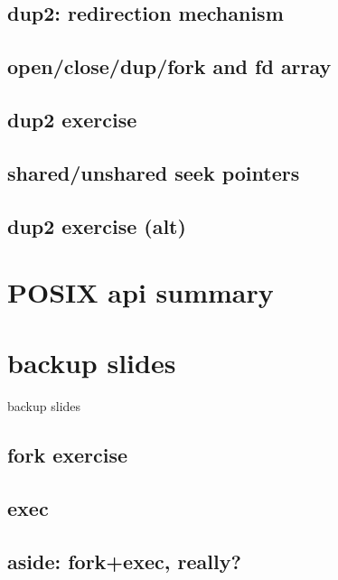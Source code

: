 


\subsection{dup2: redirection mechanism}



\subsection{open/close/dup/fork and fd array}


\subsection{dup2 exercise}


\subsection{shared/unshared seek pointers}


\subsection{dup2 exercise (alt)}


\section{POSIX api summary}





\section{backup slides}
\begin{frame}{backup slides}
\end{frame}

\subsection{fork exercise}




\subsection{exec}




\subsection{aside: fork+exec, really?}






